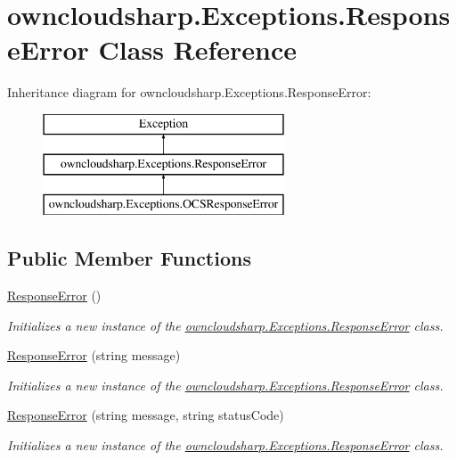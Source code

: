 \hypertarget{classowncloudsharp_1_1_exceptions_1_1_response_error}{}\section{owncloudsharp.\+Exceptions.\+Response\+Error Class Reference}
\label{classowncloudsharp_1_1_exceptions_1_1_response_error}
Inheritance diagram for owncloudsharp.\+Exceptions.\+Response\+Error\+:\begin{figure}[H]
\begin{center}
\leavevmode
\includegraphics[height=3.000000cm]{classowncloudsharp_1_1_exceptions_1_1_response_error}
\end{center}
\end{figure}
\subsection*{Public Member Functions}
\begin{DoxyCompactItemize}
\item 
\hyperlink{classowncloudsharp_1_1_exceptions_1_1_response_error_adb1ae6b0d1d79b9bcbc9377972fcc6d3}{Response\+Error} ()
\begin{DoxyCompactList}\small\item\em Initializes a new instance of the \hyperlink{classowncloudsharp_1_1_exceptions_1_1_response_error}{owncloudsharp.\+Exceptions.\+Response\+Error} class. \end{DoxyCompactList}\item 
\hyperlink{classowncloudsharp_1_1_exceptions_1_1_response_error_a6cc937c53060ad2da8d93396fa63803d}{Response\+Error} (string message)
\begin{DoxyCompactList}\small\item\em Initializes a new instance of the \hyperlink{classowncloudsharp_1_1_exceptions_1_1_response_error}{owncloudsharp.\+Exceptions.\+Response\+Error} class. \end{DoxyCompactList}\item 
\hyperlink{classowncloudsharp_1_1_exceptions_1_1_response_error_a9c7dcb21a9f787b2085421421f6341aa}{Response\+Error} (string message, string status\+Code)
\begin{DoxyCompactList}\small\item\em Initializes a new instance of the \hyperlink{classowncloudsharp_1_1_exceptions_1_1_response_error}{owncloudsharp.\+Exceptions.\+Response\+Error} class. \end{DoxyCompactList}\end{DoxyCompactItemize}

